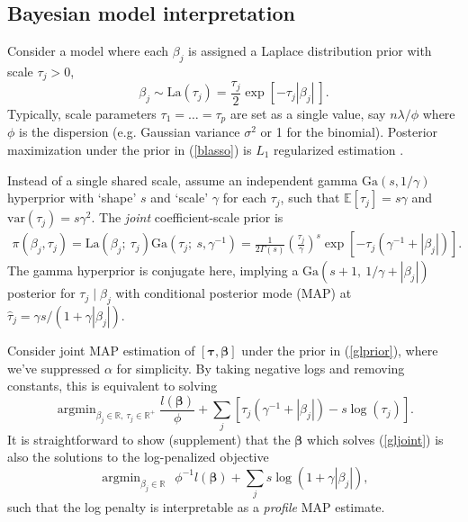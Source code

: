 \documentclass[12pt]{article}
\newcommand{\bs}[1]{\boldsymbol{#1}}
\newcommand{\mr}[1]{\mathrm{#1}}
\newcommand{\ds}[1]{\mathds{#1}}
\DeclareMathOperator*{\argmin}{argmin}
\begin{document}
\subsection{Bayesian model interpretation}

Consider a model where each $\beta_j$ is
assigned a Laplace distribution prior with scale $\tau_j>0$,
\begin{equation}\label{blasso}
\beta_j \sim \mr{La}\left(\tau_j\right) =
\frac{\tau_j}{2}\exp\left[ -\tau_j|\beta_j| ~\right].
\end{equation}
Typically, scale parameters $\tau_1 =
\ldots = \tau_p$ are set as a single value, say $n\lambda/\phi$ where
 $\phi$ is the dispersion (e.g. Gaussian variance
$\sigma^2$ or 1 for the binomial).   Posterior
maximization under the prior in (\ref{blasso}) is $L_1$ regularized estimation \citep[e.g.,][]{park_bayesian_2008}.

Instead of a single shared scale, assume an independent gamma
$\mr{Ga}(s,1/\gamma)$ hyperprior with `shape' $s$ and `scale' $\gamma$ for
each $\tau_j$, such that $\ds{E}[\tau_j] = s\gamma$ and $\mr{var}(\tau_j) =
s\gamma^2$.  The {\it joint} coefficient-scale prior is
\begin{align}\label{glprior}
\pi(\beta_j,\tau_j) = \mr{La}\left(\beta_j ;~ \tau_j\right)
\mr{Ga}\left(\tau_j;~ s,\gamma^{-1}\right) = \frac{ 1}{2\Gamma({s})} 
\left(\frac{\tau_j}{\gamma}\right)^{s}
               \exp\left[-\tau_j(\gamma^{-1}+|\beta_j|)\right].
\end{align}
The gamma hyperprior is conjugate here, implying a $\mr{Ga}\left(s+1, ~1/\gamma +
|\beta_j|\right)$ posterior for $\tau_j \mid \beta_j$ with conditional
posterior mode (MAP) at $\hat\tau_j = \gamma s/(1 + \gamma |\beta_j|)$.

Consider joint MAP estimation of $[\bs{\tau},\bs{\beta}]$ under the prior in
   (\ref{glprior}), where we've suppressed $\alpha$ for simplicity. By taking
   negative logs and removing constants, this is equivalent to solving
\begin{equation}\label{gljoint}
\argmin_{\beta_j\in\ds{R},~\tau_j \in \ds{R}^{+}}\!\!
\frac{l(\bs{\beta})}{\phi} + \sum_j \left[\tau_j(\gamma^{-1}+|\beta_j|) - s\log(\tau_j)\right].
\end{equation}
It is straightforward to show (supplement) that the $\bs{\beta}$ which solves (\ref{gljoint})  is also the solutions 
to the log-penalized objective 
\begin{equation}\label{logobj}
\argmin_{\beta_j\in\ds{R}}~~
\phi^{-1}l(\bs{\beta}) + \sum_j  s\log(1+\gamma|\beta_j|),
\end{equation}
such that the log penalty is interpretable as a {\it profile} MAP estimate.
\end{document}
